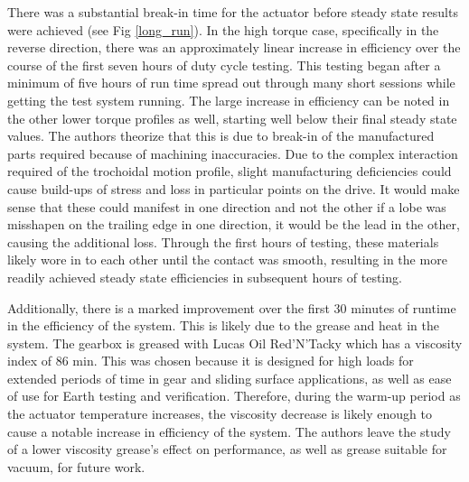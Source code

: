 There was a substantial break-in time for the actuator before steady state results were achieved (see Fig \ref{long_run}).
In the high torque case, specifically in the reverse direction, there was an approximately linear increase in efficiency over the course of the first seven hours of duty cycle testing.
This testing began after a minimum of five hours of run time spread out through many short sessions while getting the test system running.
The large increase in efficiency can be noted in the other lower torque profiles as well, starting well below their final steady state values.
The authors theorize that this is due to break-in of the manufactured parts required because of machining inaccuracies.
Due to the complex interaction required of the trochoidal motion profile, slight manufacturing deficiencies could cause build-ups of stress and loss in particular points on the drive.
It would make sense that these could manifest in one direction and not the other if a lobe was misshapen on the trailing edge in one direction, it would be the lead in the other, causing the additional loss.
Through the first hours of testing, these materials likely wore in to each other until the contact was smooth, resulting in the more readily achieved steady state efficiencies in subsequent hours of testing.

Additionally, there is a marked improvement over the first 30 minutes of runtime in the efficiency of the system.
This is likely due to the grease and heat in the system.
The gearbox is greased with Lucas Oil Red'N'Tacky which has a viscosity index of 86 min.
This was chosen because it is designed for high loads for extended periods of time in gear and sliding surface applications, as well as ease of use for Earth testing and verification.
Therefore, during the warm-up period as the actuator temperature increases, the viscosity decrease is likely enough to cause a notable increase in efficiency of the system.
The authors leave the study of a lower viscosity grease's effect on performance, as well as grease suitable for vacuum, for future work.

